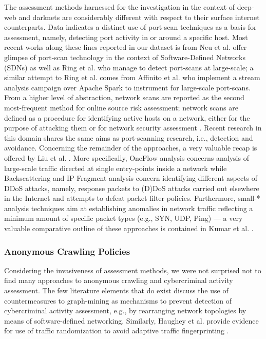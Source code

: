 The assessment methods harnessed for the investigation in the context of deep-web and darknets are considerably different with respect to their surface internet counterparts. Data indicates a distinct use of port-scan \cite{GadgeP08,KikuchiFTD08} techniques as a basis for assessment, namely, detecting port activity in or around a specific host. Most recent works along these lines reported in our dataset is from Neu et al. \cite{NeuTLMOZ18} offer glimpse of port-scan technology in the context of Software-Defined Networks (SDNs) \cite{sorensen2012} as well as Ring et al. \cite{ring2018} who manage to detect port-scans at large-scale; a similar attempt to Ring et al. comes from Affinito et al. \cite{Affinito2018} who implement a stream analysis campaign over Apache Spark to instrument for large-scale port-scans. From a higher level of abstraction, network scans \cite{MazelFF16} are reported as the second most-frequent method for online source risk assessment; network scans are defined as a procedure for identifying active hosts on a network, either for the purpose of attacking them or for network security assessment \cite{LeckieR02}. Recent research in this domain shares the same aims as port-scanning research, i.e., detection and avoidance. Concerning the remainder of the approaches, a very valuable recap is offered by Liu et al. \cite{LiuF18}. More specifically, OneFlow analysis concerns analysis of large-scale traffic directed at single entry-points inside a network \cite{YegneswaranBP04,NishikazeOKBNS15} while Backscattering \cite{BalkanliZH15} and IP-Fragment analysis \cite{KimKH13} concern identifying different aspects of DDoS attacks, namely, response packets to (D)DoS attacks carried out elsewhere in the Internet and attempts to defeat packet filter policies. Furthermore, small-* analysis techniques aim at establishing anomalies in network traffic reflecting a minimum amount of specific packet types (e.g., SYN, UDP, Ping) --- a very valuable comparative outline of these approaches is contained in Kumar et al. \cite{kumar2014intrusion}.

\subsubsection{Anonymous Crawling Policies}

Considering the invasiveness of assessment methods, we were not surprised not to find many approaches to anonymous crawling and cybercriminal activity assessment. The few literature elements that do exist discuss the use of countermeasures to graph-mining \cite{PhillipsL09} as mechanisms to prevent detection of cybercriminal activity assessment, e.g., by rearranging network topologies by means of software-defined networking. Similarly, Haughey et al. provide evidence for use of traffic randomization  to avoid adaptive traffic fingerprinting \cite{Haughey18}.

